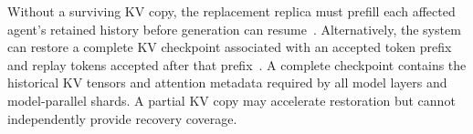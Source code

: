 Without a surviving KV copy, the replacement replica must prefill each affected agent's retained history before generation can resume~\cite{strati2024dejavu}. Alternatively, the system can restore a complete KV checkpoint associated with an accepted token prefix and replay tokens accepted after that prefix~\cite{strati2024dejavu,cao2026lumen}. A complete checkpoint contains the historical KV tensors and attention metadata required by all model layers and model-parallel shards. A partial KV copy may accelerate restoration but cannot independently provide recovery coverage.

